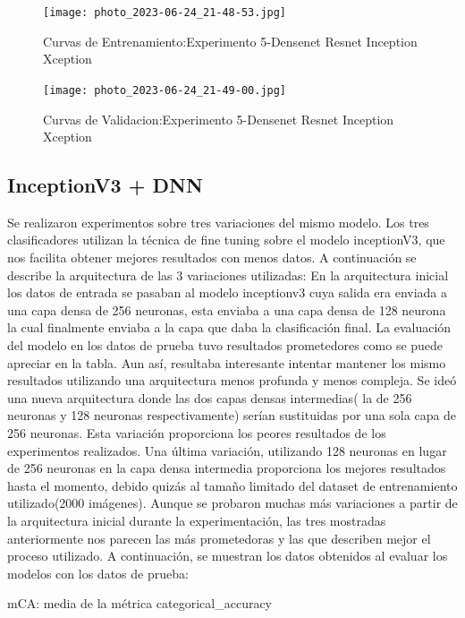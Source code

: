 \documentclass[article]{llncs}
\begin{document}
\begin{figure}[ht]
    \centering
    \texttt{[image: photo\_2023-06-24\_21-48-53.jpg]}
    \caption{Curvas de Entrenamiento:Experimento 5-Densenet Resnet Inception Xception}
    \label{fig:exp5_sample1}
    \end{figure}
    
    \begin{figure}[ht]
    \centering
    \texttt{[image: photo\_2023-06-24\_21-49-00.jpg]}
    \caption{Curvas de Validacion:Experimento 5-Densenet Resnet Inception Xception}
    \label{fig:exp5_sample2}
    \end{figure}

\subsection{InceptionV3 + DNN}

Se realizaron experimentos sobre tres variaciones del mismo modelo. Los tres clasificadores utilizan la técnica de fine tuning
sobre el modelo inceptionV3, que nos facilita obtener mejores resultados con menos datos. A continuación se describe la 
arquitectura de las 3 variaciones utilizadas:  
En la arquitectura inicial los datos de entrada se pasaban al modelo inceptionv3 cuya salida era enviada a una capa densa de 
256 neuronas, esta enviaba a una capa densa de 128 neurona la cual finalmente enviaba a la capa que daba la clasificación 
final. La evaluación del modelo en los datos de prueba tuvo resultados prometedores como se puede apreciar en la tabla. Aun 
así, resultaba interesante intentar mantener los mismo resultados utilizando una arquitectura menos profunda y menos 
compleja. Se ideó una nueva arquitectura donde las dos capas densas intermedias( la de 256 neuronas y 128 neuronas 
respectivamente) serían sustituidas por una sola capa de 256 neuronas. Esta variación proporciona los peores resultados de 
los experimentos realizados. Una última variación, utilizando 128 neuronas en lugar de 256 neuronas en la capa densa 
intermedia proporciona los mejores resultados hasta el momento, debido quizás al tamaño limitado del dataset de entrenamiento 
utilizado(2000 imágenes). Aunque se probaron muchas más variaciones a partir de la arquitectura inicial durante la 
experimentación, las tres mostradas anteriormente nos parecen las más prometedoras y las que describen mejor el proceso 
utilizado.  
A continuación, se muestran los datos obtenidos al evaluar los modelos con los datos de prueba:

mCA: media de la métrica categorical\_accuracy
\end{document}
